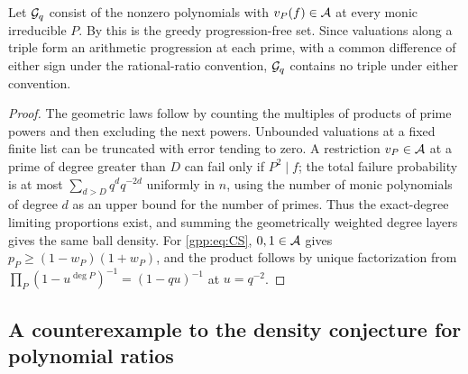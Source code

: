 Let $\mathcal{G}_q$ consist of the nonzero polynomials with $v_P(f)\in\mathcal{A}$ at every monic
irreducible $P$. By \cite[Theorem~2.2]{Asada2017Subsets} this is the greedy
progression-free set. Since valuations along a triple form an arithmetic progression at
each prime, with a common difference of either sign under the rational-ratio convention,
$\mathcal{G}_q$ contains no triple under either convention.


\begin{proof}
The geometric laws follow by counting the multiples of products of prime powers and then
excluding the next powers. Unbounded valuations at a fixed finite list can be truncated
with error tending to zero. A restriction $v_P\in\mathcal{A}$ at a prime of degree greater than
$D$ can fail only if $P^2\mid f$; the total failure probability is at most
$\sum_{d>D}q^dq^{-2d}$ uniformly in $n$, using the number of monic polynomials of degree
$d$ as an upper bound for the number of primes. Thus the exact-degree limiting proportions
exist, and summing the geometrically weighted degree layers gives the same ball density.
For \eqref{gpp:eq:CS}, $0,1\in\mathcal{A}$ gives $p_P\ge(1-w_P)(1+w_P)$, and the product
follows by unique factorization from $\prod_P(1-u^{\deg P})^{-1}=(1-qu)^{-1}$ at
$u=q^{-2}$.
\end{proof}

\subsection{A counterexample to the density conjecture for polynomial ratios}\label{gpp:sec:counterexample}
{\raggedright{}}

